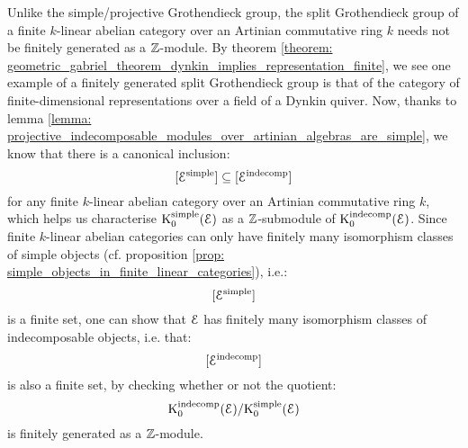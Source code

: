             \begin{remark} \label{remark: finiteness_of_split_grothendieck_groups}
                Unlike the simple/projective Grothendieck group, the split Grothendieck group of a finite $k$-linear abelian category over an Artinian commutative ring $k$ needs not be finitely generated as a $\mathbb{Z}$-module. By theorem \ref{theorem: geometric_gabriel_theorem_dynkin_implies_representation_finite}, we see one example of a finitely generated split Grothendieck group is that of the category of finite-dimensional representations over a field of a Dynkin quiver. Now, thanks to lemma \ref{lemma: projective_indecomposable_modules_over_artinian_algebras_are_simple}, we know that there is a canonical inclusion:
                    $$[\mathcal{E}^{\mathrm{simple}}] \subseteq [\mathcal{E}^{\mathrm{indecomp}}]$$
                for any finite $k$-linear abelian category over an Artinian commutative ring $k$, which helps us characterise $\mathrm{K}_0^{\mathrm{simple}}(\mathcal{E})$ as a $\mathbb{Z}$-submodule of $\mathrm{K}_0^{\mathrm{indecomp}}(\mathcal{E})$. Since finite $k$-linear abelian categories can only have finitely many isomorphism classes of simple objects (cf. proposition \ref{prop: simple_objects_in_finite_linear_categories}), i.e.:
                    $$[\mathcal{E}^{\mathrm{simple}}]$$
                is a finite set, one can show that $\mathcal{E}$ has finitely many isomorphism classes of indecomposable objects, i.e. that:
                    $$[\mathcal{E}^{\mathrm{indecomp}}]$$
                is also a finite set, by checking whether or not the quotient:
                    $$\mathrm{K}_0^{\mathrm{indecomp}}(\mathcal{E})/\mathrm{K}_0^{\mathrm{simple}}(\mathcal{E})$$
                is finitely generated as a $\mathbb{Z}$-module. 
            \end{remark}
            
